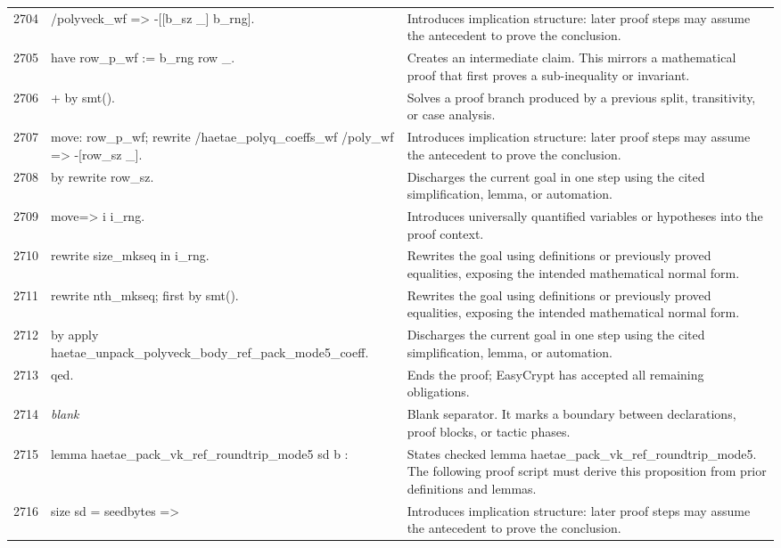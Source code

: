 \documentclass[10pt]{article}
\begin{document}
\begin{longtable}{r L{0.53\textwidth} L{0.37\textwidth}}
2704 & {\ttfamily\scriptsize                      /polyveck\_wf => -[[b\_sz \_] b\_rng].} & Introduces implication structure: later proof steps may assume the antecedent to prove the conclusion. \\
2705 & {\ttfamily\scriptsize   have row\_p\_wf := b\_rng row \_.} & Creates an intermediate claim.  This mirrors a mathematical proof that first proves a sub-inequality or invariant. \\
2706 & {\ttfamily\scriptsize   + by smt().} & Solves a proof branch produced by a previous split, transitivity, or case analysis. \\
2707 & {\ttfamily\scriptsize   move: row\_p\_wf; rewrite /haetae\_polyq\_coeffs\_wf /poly\_wf => -[row\_sz \_].} & Introduces implication structure: later proof steps may assume the antecedent to prove the conclusion. \\
2708 & {\ttfamily\scriptsize   by rewrite row\_sz.} & Discharges the current goal in one step using the cited simplification, lemma, or automation. \\
2709 & {\ttfamily\scriptsize move=> i i\_rng.} & Introduces universally quantified variables or hypotheses into the proof context. \\
2710 & {\ttfamily\scriptsize rewrite size\_mkseq in i\_rng.} & Rewrites the goal using definitions or previously proved equalities, exposing the intended mathematical normal form. \\
2711 & {\ttfamily\scriptsize rewrite nth\_mkseq; first by smt().} & Rewrites the goal using definitions or previously proved equalities, exposing the intended mathematical normal form. \\
2712 & {\ttfamily\scriptsize by apply haetae\_unpack\_polyveck\_body\_ref\_pack\_mode5\_coeff.} & Discharges the current goal in one step using the cited simplification, lemma, or automation. \\
2713 & {\ttfamily\scriptsize qed.} & Ends the proof; EasyCrypt has accepted all remaining obligations. \\
2714 & {\ttfamily\scriptsize \emph{blank}} & Blank separator.  It marks a boundary between declarations, proof blocks, or tactic phases. \\
2715 & {\ttfamily\scriptsize lemma haetae\_pack\_vk\_ref\_roundtrip\_mode5 sd b :} & States checked lemma haetae\_pack\_vk\_ref\_roundtrip\_mode5.  The following proof script must derive this proposition from prior definitions and lemmas. \\
2716 & {\ttfamily\scriptsize   size sd = seedbytes =>} & Introduces implication structure: later proof steps may assume the antecedent to prove the conclusion. \\

\end{longtable}
\end{document}
